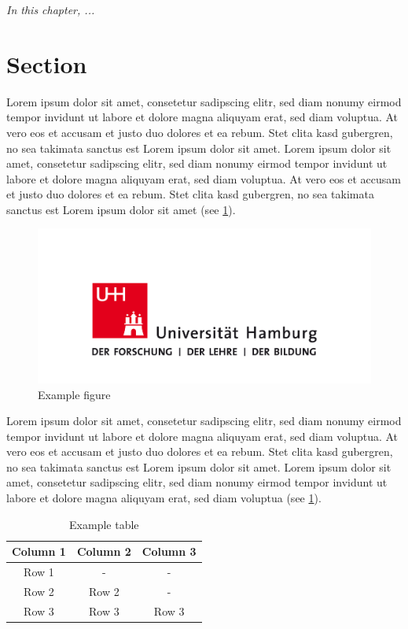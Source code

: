 \documentclass[
	12pt,
	a4paper,
	BCOR10mm,
	DIV14,
	headsepline,
]{scrreprt}
\begin{document}
\textit{%
In this chapter, ...
}

\bigskip

\section{Section}

Lorem ipsum dolor sit amet, consetetur sadipscing elitr, sed diam nonumy eirmod tempor invidunt ut labore et dolore magna aliquyam erat, sed diam voluptua.
At vero eos et accusam et justo duo dolores et ea rebum.
Stet clita kasd gubergren, no sea takimata sanctus est Lorem ipsum dolor sit amet.
Lorem ipsum dolor sit amet, consetetur sadipscing elitr, sed diam nonumy eirmod tempor invidunt ut labore et dolore magna aliquyam erat, sed diam voluptua.
At vero eos et accusam et justo duo dolores et ea rebum.
Stet clita kasd gubergren, no sea takimata sanctus est Lorem ipsum dolor sit amet (see \cref{fig:logo}).

\begin{figure}[h]
	\centering
	\includegraphics[height=0.2\textheight]{logo.jpg}
	\caption{Example figure}
	\label{fig:logo}
\end{figure}

Lorem ipsum dolor sit amet, consetetur sadipscing elitr, sed diam nonumy eirmod tempor invidunt ut labore et dolore magna aliquyam erat, sed diam voluptua.
At vero eos et accusam et justo duo dolores et ea rebum.
Stet clita kasd gubergren, no sea takimata sanctus est Lorem ipsum dolor sit amet.
Lorem ipsum dolor sit amet, consetetur sadipscing elitr, sed diam nonumy eirmod tempor invidunt ut labore et dolore magna aliquyam erat, sed diam voluptua (see \cref{table:table}).

\begin{table}
	\centering
	\begin{tabular}{|c|c|c|}\hline
		Column 1 & Column 2 & Column 3 \\
		\hline
		Row 1    &   -      & -        \\
		Row 2    &  Row 2   & -        \\
		Row 3    &  Row 3   & Row 3    \\
		\hline
	\end{tabular}
	\caption{Example table}
	\label{table:table}
\end{table}
\end{document}
